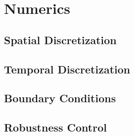 \section{Numerics}


\subsection{Spatial Discretization}

\subsection{Temporal Discretization}

\subsection{Boundary Conditions}

\subsection{Robustness Control}